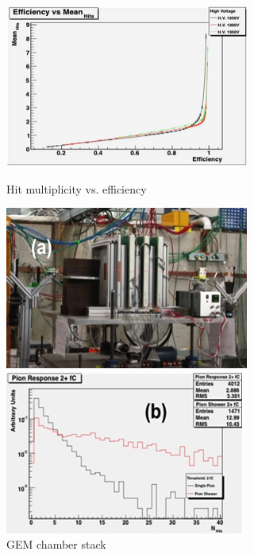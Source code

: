 \begin{figure}
	\centering
	\begin{minipage}{.33\textwidth}
		\centering
		\includegraphics[width=\textwidth]{Calorimeter/GEM_HCAL/multiplicityVSefficiency}
		\caption{Hit multiplicity vs. efficiency}
		\label{fig:Calorimeter:GEM:multiplicityVSefficiency}
	\end{minipage}\hfill
	\begin{minipage}{.33\textwidth}
		\centering
		\includegraphics[width=\textwidth]{Calorimeter/GEM_HCAL/chamberStack}
		\caption{GEM chamber stack}
		\label{fig:Calorimeter:GEM:chamberStack}
	\end{minipage}\hfill
	\begin{minipage}{.33\textwidth}
		\centering
		\includegraphics[width=\textwidth]{Calorimeter/GEM_HCAL/pionBeam}

\end{minipage}
\end{figure}

